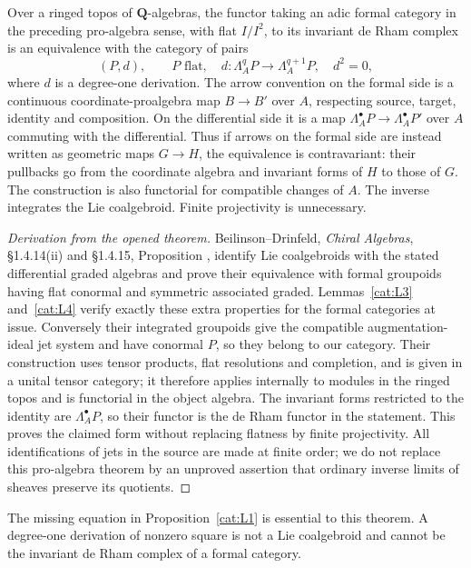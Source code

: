 \begin{theorem}\label{cat:L5}
Over a ringed topos of $\mathbf Q$-algebras, the functor taking an adic
formal category in the preceding pro-algebra sense, with flat $I/I^2$,
to its invariant de Rham complex is
an equivalence with the category of pairs
\[
 (P,d),\qquad P\text{ flat},\quad
 d:\Lambda_A^qP\longrightarrow\Lambda_A^{q+1}P,
 \quad d^2=0,
\]
where $d$ is a degree-one derivation.  The arrow convention on the
formal side is a continuous coordinate-proalgebra map $B\to B'$
over $A$, respecting source, target, identity and composition.
On the differential side it is a map
$\Lambda_A^\bullet P\to\Lambda_A^\bullet P'$ over $A$ commuting
with the differential.  Thus if arrows on the formal side are instead
written as geometric maps $G\to H$, the equivalence is contravariant:
their pullbacks go from the coordinate algebra and invariant forms of
$H$ to those of $G$.  The construction is also functorial for compatible
changes of $A$.  The inverse integrates the
Lie coalgebroid.  Finite projectivity is unnecessary.
\end{theorem}
\begin{proof}[Derivation from the opened theorem]
Beilinson--Drinfeld, \emph{Chiral Algebras},
\S1.4.14(ii) and \S1.4.15, Proposition
\cite{catBeilinsonDrinfeld2004}, identify Lie coalgebroids with the
stated differential graded algebras and prove their equivalence with
formal groupoids having flat conormal and symmetric associated graded.
Lemmas~\ref{cat:L3} and~\ref{cat:L4} verify exactly these extra
properties for the formal categories at issue.  Conversely their
integrated groupoids give the compatible augmentation-ideal jet system
and have conormal $P$, so they belong to our category.  Their construction uses
tensor products, flat resolutions and completion, and is given in a
unital tensor category; it therefore applies internally to modules in
the ringed topos and is functorial in the object algebra.  The invariant
forms restricted to the identity are $\Lambda_A^\bullet P$, so their
functor is the de Rham functor in the statement.  This proves the
claimed form without replacing flatness by finite projectivity.
All identifications of jets in the source are made at finite order;
we do not replace this pro-algebra theorem by an unproved assertion
that ordinary inverse limits of sheaves preserve its quotients.
\end{proof}

The missing equation in Proposition~\ref{cat:L1} is essential to this
theorem.  A degree-one derivation of nonzero square is not a Lie
coalgebroid and cannot be the invariant de Rham complex of a formal
category.

